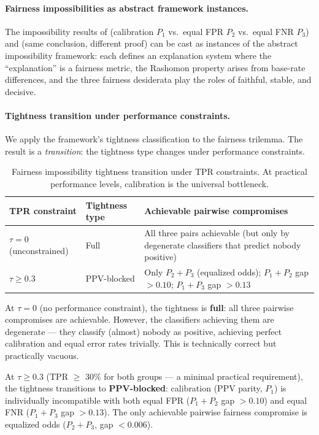 \documentclass{article}
\begin{document}
\paragraph{Fairness impossibilities as abstract framework instances.}
The impossibility results of \citet{chouldechova2017fair} (calibration $P_1$ vs.\ equal FPR $P_2$ vs.\ equal FNR $P_3$) and \citet{kleinberg2017inherent} (same conclusion, different proof) can be cast as instances of the abstract impossibility framework: each defines an explanation system where the ``explanation'' is a fairness metric, the Rashomon property arises from base-rate differences, and the three fairness desiderata play the roles of faithful, stable, and decisive.

\paragraph{Tightness transition under performance constraints.}
We apply the framework's tightness classification to the fairness trilemma. The result is a \emph{transition}: the tightness type changes under performance constraints.

\begin{table}[ht]
\centering
\caption{Fairness impossibility tightness transition under TPR constraints. At practical performance levels, calibration is the universal bottleneck.}
\label{tab:fairness-tightness}
\small
\begin{tabular}{@{}llp{7cm}@{}}
\toprule
\textbf{TPR constraint} & \textbf{Tightness type} & \textbf{Achievable pairwise compromises} \\
\midrule
$\tau = 0$ (unconstrained) & Full & All three pairs achievable (but only by degenerate classifiers that predict nobody positive) \\
$\tau \geq 0.3$ & PPV-blocked & Only $P_2{+}P_3$ (equalized odds); $P_1{+}P_2$ gap $> 0.10$; $P_1{+}P_3$ gap $> 0.13$ \\
\bottomrule
\end{tabular}
\end{table}

At $\tau = 0$ (no performance constraint), the tightness is \textbf{full}: all three pairwise compromises are achievable. However, the classifiers achieving them are degenerate --- they classify (almost) nobody as positive, achieving perfect calibration and equal error rates trivially. This is technically correct but practically vacuous.

At $\tau \geq 0.3$ (TPR $\geq$ 30\% for both groups --- a minimal practical requirement), the tightness transitions to \textbf{PPV-blocked}: calibration (PPV parity, $P_1$) is individually incompatible with both equal FPR ($P_1{+}P_2$ gap $> 0.10$) and equal FNR ($P_1{+}P_3$ gap $> 0.13$). The only achievable pairwise fairness compromise is equalized odds ($P_2{+}P_3$, gap $< 0.006$).
\end{document}
